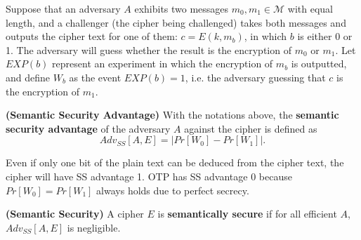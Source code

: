 Suppose that an adversary $A$ exhibits two messages $m_0,m_1\in\mathcal{M}$ with equal length, and a challenger (the cipher being challenged) takes both messages and outputs the cipher text for one of them: $c=E(k,m_b)$, in which $b$ is either 0 or 1. The adversary will guess whether the result is the encryption of $m_0$ or $m_1$. Let $EXP(b)$ represent an experiment in which the encryption of $m_b$ is outputted, and define $W_b$ as the event $EXP(b)=1$, i.e. the adversary guessing that $c$ is the encryption of $m_1$. 
\begin{definition}\textbf{(Semantic Security Advantage)}
With the notations above, the \textbf{semantic security advantage} of the adversary $A$ against the cipher is defined as 
\[Adv_{SS}[A,E]=\left\lvert Pr[W_0]-Pr[W_1]\right\rvert.\]
\end{definition}
Even if only one bit of the plain text can be deduced from the cipher text, the cipher will have SS advantage 1. OTP has SS advantage 0 because $Pr[W_0]=Pr[W_1]$ always holds due to perfect secrecy.
\begin{definition}\textbf{(Semantic Security)}
A cipher $E$ is \textbf{semantically secure} if for all efficient $A$, $Adv_{SS}[A,E]$ is negligible.
\end{definition}

